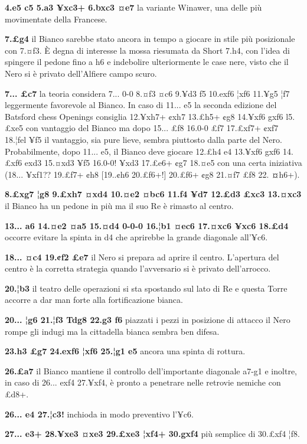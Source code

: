 \documentclass[
]{article}
\begin{document}
\textbf{4.e5 c5 5.a3 ¥xc3+ 6.bxc3 ¤e7} la variante Winawer, una delle
più movimentate della Francese.

\textbf{7.£g4} il Bianco sarebbe stato ancora in tempo a giocare in
stile più posizionale con 7.¤f3. È degna di interesse la mossa riesumata
da Short 7.h4, con l'idea di spingere il pedone fino a h6 e indebolire
ulteriormente le case nere, visto che il Nero si è privato dell'Alfiere
campo scuro.

\textbf{7... £c7} la teoria considera 7... 0-0 8.¤f3 ¤c6 9.¥d3 f5
10.exf6 ¦xf6 11.¥g5 ¦f7 leggermente favorevole al Bianco. In caso di
11... e5 la seconda edizione del Batsford chess Openings consiglia
12.¥xh7+ ¢xh7 13.£h5+ ¢g8 14.¥xf6 gxf6 l5.£xe5 con vantaggio del Bianco
ma dopo 15... £f8 16.0-0 £f7 17.£xf7+ ¢xf7 18.¦fel ¥f5 il vantaggio, sia
pure lieve, sembra piuttosto dalla parte del Nero. Probabilmente, dopo
11... e5, il Bianco deve giocare 12.£h4 e4 13.¥xf6 gxf6 14.£xf6 exd3
15.¤xd3 ¥f5 16.0-0! ¥xd3 17.£e6+ ¢g7 18.¤e5 con una certa iniziativa
(18... ¥xf1?? 19.£f7+ ¢h8 {[}19..¢h6 20.£f6+!{]} 20.£f6+ ¢g8 21.¤f7 £f8
22. \textbf{¤}h6+).

\textbf{8.£xg7 ¦g8 9.£xh7 ¤xd4 10.¤e2 ¤bc6 11.f4 ¥d7 12.£d3 £xc3
13.¤xc3} il Bianco ha un pedone in più ma il suo Re è rimasto al centro.

\textbf{13... a6 14.¤e2 ¤a5 15.¤d4 0-0-0 16.¦b1 ¤ec6 17.¤xc6 ¥xc6
18.£d4} occorre evitare la spinta in d4 che aprirebbe la grande
diagonale all'¥c6.

\textbf{18... ¤c4 19.¢f2 £e7} il Nero si prepara ad aprire il centro.
L'apertura del centro è la corretta strategia quando l'avversario si è
privato dell'arrocco.

\textbf{20.¦b3} il teatro delle operazioni si sta spostando sul lato di
Re e questa Torre accorre a dar man forte alla fortificazione bianca.

\textbf{20... ¦g6 21.¦f3 Tdg8 22.g3 f6} piazzati i pezzi in posizione di
attacco il Nero rompe gli indugi ma la cittadella bianca sembra ben
difesa.

\textbf{23.h3 £g7 24.exf6 ¦xf6 25.¦g1 e5} ancora una spinta di rottura.

\textbf{26.£a7} il Bianco mantiene il controllo dell'importante
diagonale a7-g1 e inoltre, in caso di 26... exf4 27.¥xf4, è pronto a
penetrare nelle retrovie nemiche con £d8+.

\textbf{26... e4 27.¦c3!} inchioda in modo preventivo l'¥c6.

\textbf{27... e3+ 28.¥xe3 ¤xe3 29.£xe3 ¦xf4+ 30.gxf4} più semplice di
30.£xf4 ¦f8.
\end{document}
